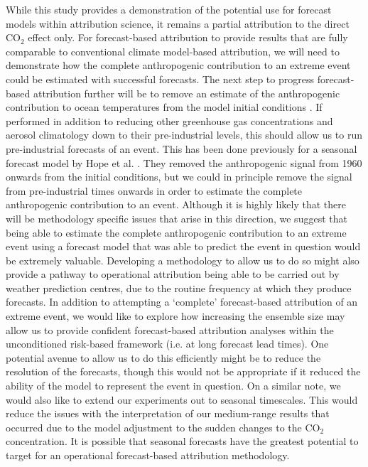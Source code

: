   While this study provides a demonstration of the potential use for forecast models within attribution science, it remains a partial attribution to the direct CO$_2$ effect only. For forecast-based attribution to provide results that are fully comparable to conventional climate model-based attribution, we will need to demonstrate how the complete anthropogenic contribution to an extreme event could be estimated with successful forecasts. The next step to progress forecast-based attribution further will be to remove an estimate of the anthropogenic contribution to ocean temperatures from the model initial conditions \citep[e.g.][]{stone_benchmark_2021}. If performed in addition to reducing other greenhouse gas concentrations and aerosol climatology down to their pre-industrial levels, this should allow us to run pre-industrial forecasts of an event. This has been done previously for a seasonal forecast model by Hope et al. \citep{hope_contributors_2015,hope_what_2016,hope_determining_2019}. They removed the anthropogenic signal from 1960 onwards from the initial conditions, but we could in principle remove the signal from pre-industrial times onwards in order to estimate the complete anthropogenic contribution to an event. Although it is highly likely that there will be methodology specific issues that arise in this direction, we suggest that being able to estimate the complete anthropogenic contribution to an extreme event using a forecast model that was able to predict the event in question would be extremely valuable. Developing a methodology to allow us to do so might also provide a pathway to operational attribution being able to be carried out by weather prediction centres, due to the routine frequency at which they produce forecasts. In addition to attempting a `complete' forecast-based attribution of an extreme event, we would like to explore how increasing the ensemble size may allow us to provide confident forecast-based attribution analyses within the unconditioned risk-based framework (i.e. at long forecast lead times). One potential avenue to allow us to do this efficiently might be to reduce the resolution of the forecasts, though this would not be appropriate if it reduced the ability of the model to represent the event in question. On a similar note, we would also like to extend our experiments out to seasonal timescales. This would reduce the issues with the interpretation of our medium-range results that occurred due to the model adjustment to the sudden changes to the CO$_2$ concentration. It is possible that seasonal forecasts have the greatest potential to target for an operational forecast-based attribution methodology.

